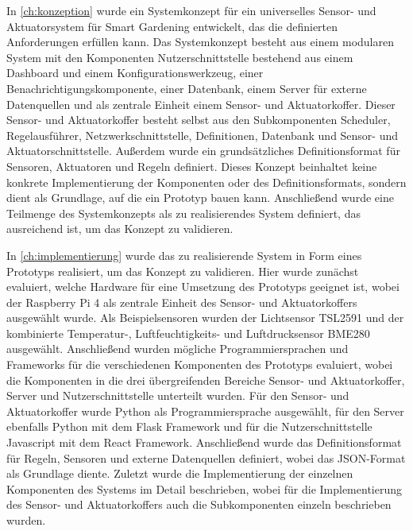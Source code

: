 In \cref{ch:konzeption} wurde ein Systemkonzept für ein universelles Sensor- und Aktuatorsystem für Smart Gardening entwickelt, das die definierten Anforderungen erfüllen kann.
Das Systemkonzept besteht aus einem modularen System mit den Komponenten Nutzerschnittstelle bestehend aus einem Dashboard und einem Konfigurationswerkzeug, einer Benachrichtigungskomponente, einer Datenbank, einem Server für externe Datenquellen und als zentrale Einheit einem Sensor- und Aktuatorkoffer.
Dieser Sensor- und Aktuatorkoffer besteht selbst aus den Subkomponenten Scheduler, Regelausführer, Netzwerkschnittstelle, Definitionen, Datenbank und Sensor- und Aktuatorschnittstelle.
Außerdem wurde ein grundsätzliches Definitionsformat für Sensoren, Aktuatoren und Regeln definiert.
Dieses Konzept beinhaltet keine konkrete Implementierung der Komponenten oder des Definitionsformats, sondern dient als Grundlage, auf die ein Prototyp bauen kann.
Anschließend wurde eine Teilmenge des Systemkonzepts als zu realisierendes System definiert, das ausreichend ist, um das Konzept zu validieren.


In \cref{ch:implementierung} wurde das zu realisierende System in Form eines Prototyps realisiert, um das Konzept zu validieren.
Hier wurde zunächst evaluiert, welche Hardware für eine Umsetzung des Prototyps geeignet ist, wobei der Raspberry Pi 4 als zentrale Einheit des Sensor- und Aktuatorkoffers ausgewählt wurde.
Als Beispielsensoren wurden der Lichtsensor TSL2591 und der kombinierte Temperatur-, Luftfeuchtigkeits- und Luftdrucksensor BME280 ausgewählt.
Anschließend wurden mögliche Programmiersprachen und Frameworks für die verschiedenen Komponenten des Prototyps evaluiert, wobei die Komponenten in die drei übergreifenden Bereiche Sensor- und Aktuatorkoffer, Server und Nutzerschnittstelle unterteilt wurden.
Für den Sensor- und Aktuatorkoffer wurde Python als Programmiersprache ausgewählt, für den Server ebenfalls Python mit dem Flask Framework und für die Nutzerschnittstelle Javascript mit dem React Framework.
Anschließend wurde das Definitionsformat für Regeln, Sensoren und externe Datenquellen definiert, wobei das JSON-Format als Grundlage diente.
Zuletzt wurde die Implementierung der einzelnen Komponenten des Systems im Detail beschrieben, wobei für die Implementierung des Sensor- und Aktuatorkoffers auch die Subkomponenten einzeln beschrieben wurden.

